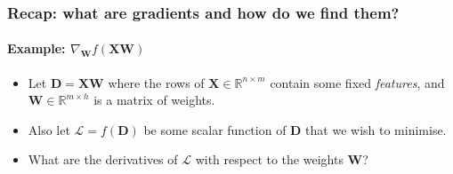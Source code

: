 \documentclass[]{article}
\begin{document}

\begin{frame}
\frametitle{Recap: what are gradients and how do we find them?}
\framesubtitle{Example: $\nabla_{\bm W} f(\bm X \bm W)$}
\begin{itemize}
\item<1-> Let $\bm D = \bm X \bm W$ where the rows of $\bm X \in \mathbb{R}^{n \times m}$ contain some fixed \emph{features}, and $\bm W \in \mathbb{R}^{m \times h}$ is a matrix of weights.
\item<1-> Also let $\mathcal{L} = f(\bm D)$ be some scalar function of $\bm D$ that we wish to minimise. 
\item<2-> What are the derivatives of $\mathcal{L}$ with respect to the weights $\bm W$?
\end{itemize}
\end{frame}
\end{document}
